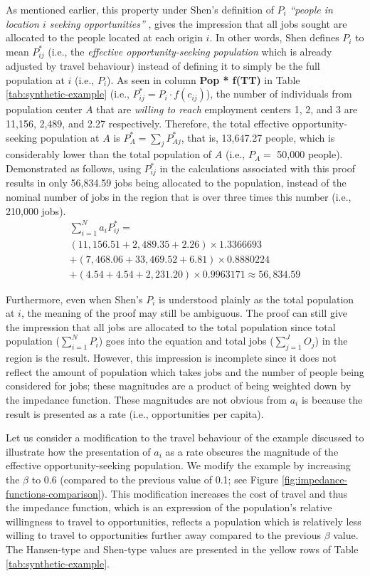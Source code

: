 \documentclass[10pt,letterpaper]{article}
\begin{document}
As mentioned earlier, this property under Shen's definition of \(P_i\)
\emph{``people in location \(i\) seeking opportunities''} , gives the
impression that all jobs sought are allocated to the people located at
each origin \(i\). In other words, Shen defines \(P_i\) to mean
\(P_{ij}^*\) (i.e., the \emph{effective opportunity-seeking population}
which is already adjusted by travel behaviour) instead of defining it to
simply be the full population at \(i\) (i.e., \(P_i\)). As seen in
column \textbf{Pop * f(TT)} in Table \ref{tab:synthetic-example} (i.e.,
\(P_{ij}^* = P_i\cdot f(c_{ij})\)), the number of individuals from
population center \(A\) that are \emph{willing to reach} employment
centers 1, 2, and 3 are 11,156, 2,489, and 2.27 respectively. Therefore,
the total effective opportunity-seeking population at \(A\) is
\(P_A^* = \sum_jP_{Aj}^*\), that is, 13,647.27 people, which is
considerably lower than the total population of \(A\) (i.e., \(P_A=\)
50,000 people). Demonstrated as follows, using \(P_{ij}^*\) in the
calculations associated with this proof results in only 56,834.59 jobs
being allocated to the population, instead of the nominal number of jobs
in the region that is over three times this number (i.e., 210,000 jobs).
\[
\begin{array}{l}
\sum_{i=1}^N a_{i} P_{ij}^* =\\
(11,156.51 + 2,489.35 + 2.26)\times 1.3366693 \\
+ (7,468.06 + 33,469.52 + 6.81)\times 0.8880224\\
+ (4.54 + 4.54 + 2,231.20)\times 0.9963171 \approx 56,834.59
\end{array}
\]

Furthermore, even when Shen's \(P_i\) is understood plainly as the total
population at \(i\), the meaning of the proof may still be ambiguous.
The proof can still give the impression that all jobs are allocated to
the total population since total population (\(\sum_{i=1}^N P_i\)) goes
into the equation and total jobs (\(\sum_{j=1}^JO_j\)) in the region is
the result. However, this impression is incomplete since it does not
reflect the amount of population which takes jobs and the number of
people being considered for jobs; these magnitudes are a product of
being weighted down by the impedance function. These magnitudes are not
obvious from \(a_i\) is because the result is presented as a rate (i.e.,
opportunities per capita).

Let us consider a modification to the travel behaviour of the example
discussed to illustrate how the presentation of \(a_i\) as a rate
obscures the magnitude of the effective opportunity-seeking population.
We modify the example by increasing the \(\beta\) to 0.6 (compared to
the previous value of 0.1; see Figure
\ref{fig:impedance-functions-comparison}). This modification increases
the cost of travel and thus the impedance function, which is an
expression of the population's relative willingness to travel to
opportunities, reflects a population which is relatively less willing to
travel to opportunities further away compared to the previous \(\beta\)
value. The Hansen-type and Shen-type values are presented in the yellow
rows of Table \ref{tab:synthetic-example}.
\end{document}
